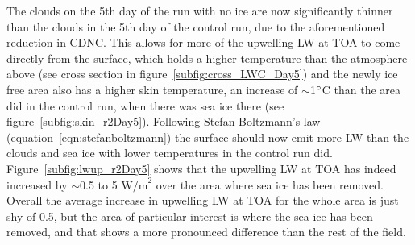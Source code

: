 The clouds on the 5th day of the run with no ice are now significantly thinner than the clouds in the 5th day of the control run, due to the aforementioned reduction in CDNC. This allows for more of the upwelling LW at TOA to come directly from the surface, which holds a higher temperature than the atmosphere above (see cross section in figure~\ref{subfig:cross_LWC_Day5}) and the newly ice free area also has a higher skin temperature, an increase of $\sim$1$\degree$C than the area did in the control run, when there was sea ice there (see figure~\ref{subfig:skin_r2Day5}). Following Stefan-Boltzmann's law (equation~\ref{eqn:stefanboltzmann}) the surface should now emit more LW than the clouds and sea ice with lower temperatures in the control run did. Figure~\ref{subfig:lwup_r2Day5} shows that the upwelling LW at TOA has indeed increased by $\sim$0.5 to 5 $\text{W/m}^2$ over the area where sea ice has been removed. Overall the average increase in upwelling LW at TOA for the whole area is just shy of 0.5, but the area of particular interest is where the sea ice has been removed, and that shows a more pronounced difference than the rest of the field.

